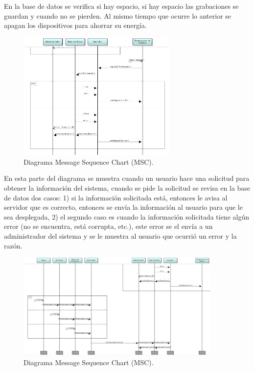 En la base de datos se verifica si hay espacio, si hay espacio las grabaciones se guardan y cuando no se pierden. Al mismo tiempo que ocurre lo anterior se apagan los dispositivos para ahorrar su energía.

\begin{figure}[h]
    \centering
    \includegraphics[width=0.70\textwidth]{images/MSC3.png}
    \caption{Diagrama Message Sequence Chart (MSC).}
    \label{MSC3}
\end{figure}

En esta parte del diagrama se muestra cuando un usuario hace una solicitud para obtener la información del sistema, cuando se pide la solicitud se revisa en la base de datos dos casos: 1) si la información solicitada está, entonces le avisa al servidor que es correcto, entonces se envía la información al usuario para que le sea desplegada, 2) el segundo caso es cuando la información solicitada tiene algún error (no se encuentra, está corrupta, etc.), este error se el envía a un administrador del sistema y se le muestra al usuario que ocurrió un error y la razón.

\begin{figure}[h]
    \centering
    \includegraphics[width=0.90\textwidth]{images/MSC4.png}
    \caption{Diagrama Message Sequence Chart (MSC).}
    \label{MSC4}
\end{figure}

